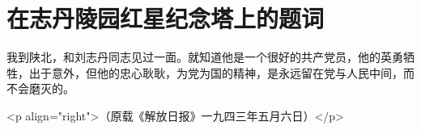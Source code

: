 \section[在志丹陵园红星纪念塔上的题词（一九四三年）]{在志丹陵园红星纪念塔上的题词}


我到陕北，和刘志丹同志见过一面。就知道他是一个很好的共产党员，他的英勇牺牲，出于意外，但他的忠心耿耿，为党为国的精神，是永远留在党与人民中间，而不会磨灭的。

<p align="right">（原载《解放日报》一九四三年五月六日）</p>

